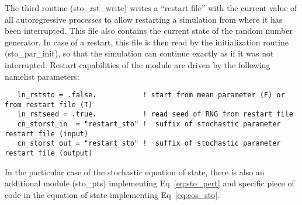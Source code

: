 \documentclass[NEMO_book]{subfiles}
\begin{document}
The third routine ({sto\_rst\_write}) writes a ``restart file''
with the current value of all autoregressive processes
to allow restarting a simulation from where it has been interrupted.
This file also contains the current state of the random number generator.
In case of a restart, this file is then read by the initialization routine
({sto\_par\_init}), so that the simulation can continue exactly
as if it was not interrupted.
Restart capabilities of the module are driven by the following namelist parameters:
\begin{alltt}
\tiny
\begin{verbatim}
   ln_rststo = .false.           ! start from mean parameter (F) or from restart file (T)
   ln_rstseed = .true.           ! read seed of RNG from restart file
   cn_storst_in  = "restart_sto" !  suffix of stochastic parameter restart file (input)
   cn_storst_out = "restart_sto" !  suffix of stochastic parameter restart file (output)
\end{verbatim}
\end{alltt}

In the particular case of the stochastic equation of state, there is also an additional module ({sto\_pts}) implementing Eq~\ref{eq:sto_pert} and specific piece of code in the equation of state implementing Eq~\ref{eq:eos_sto}.
\end{document}
